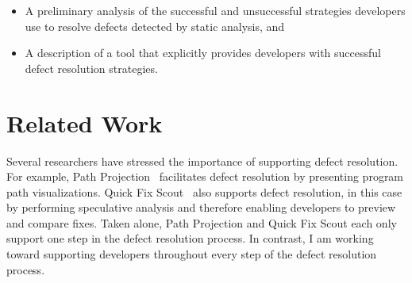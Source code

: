 \documentclass{sig-alternate}
\newcommand{\compresslist}{
	\vspace{-.5em}
	\setlength{\itemsep}{1pt}
	\setlength{\parskip}{0pt}
	\setlength{\parsep}{0pt}
}
\begin{document}


\begin{itemize}
	\compresslist
	\item A preliminary analysis of the successful and unsuccessful strategies developers use to resolve defects detected by static analysis, and
	\item A description of a tool that explicitly provides developers with successful defect resolution strategies.
	
\end{itemize}



\section{Related Work}
\label{sec:rw}
Several researchers have stressed the importance of supporting defect resolution.
For example, Path Projection~\cite{Khoo2008} facilitates defect resolution by presenting program path visualizations. 
Quick Fix Scout~\cite{Muslu2012} also supports defect resolution, in this case by performing speculative analysis and therefore enabling developers to preview and compare fixes.
Taken alone, Path Projection and Quick Fix Scout each only support one step in the defect resolution process.
In contrast, I am working toward supporting developers throughout every step of the defect resolution process.
\end{document}
